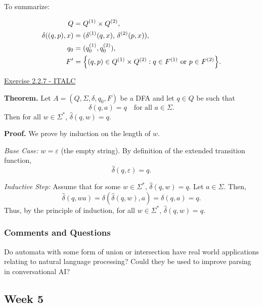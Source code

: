 \documentclass{article}
\theoremstyle{theorem}
\theoremstyle{definition}
\theoremstyle{remark}
\begin{document}
To summarize:

\[
\begin{aligned}
Q &= Q^{(1)}\times Q^{(2)}, \\
\delta((q,p),x) &= (\delta^{(1)}(q,x),\,\delta^{(2)}(p,x)), \\
q_0 &= (q_0^{(1)},q_0^{(2)}), \\
F' &= \Bigl\{(q,p) \in Q^{(1)}\times Q^{(2)} : q\in F^{(1)} \text{ or } p\in F^{(2)}\Bigr\}.
\end{aligned}
\]

\underline{Exercise 2.2.7 - ITALC}

\textbf{Theorem.} Let \(A = (Q,\Sigma,\delta,q_0,F)\) be a DFA and let \(q \in Q\) be such that 
\[
\delta(q,a) = q \quad \text{for all } a \in \Sigma.
\]
Then for all \(w \in \Sigma^*\), \(\hat{\delta}(q,w) = q\).

\textbf{Proof.} We prove by induction on the length of \(w\).

\textit{Base Case:} \(w = \varepsilon\) (the empty string).  
By definition of the extended transition function,
\[
\hat{\delta}(q,\varepsilon) = q.
\]

\textit{Inductive Step:} Assume that for some \(w \in \Sigma^*\), \(\hat{\delta}(q,w) = q\).  
Let \(a \in \Sigma\). Then,
\[
\hat{\delta}(q, wa) = \delta(\hat{\delta}(q, w), a) = \delta(q, a) = q.
\]
Thus, by the principle of induction, for all \(w \in \Sigma^*\), \(\hat{\delta}(q,w) = q\).


\subsubsection*{Comments and Questions}

Do automata with some form of union or intersection have real world applications relating to natural language processing? Could they be used to improve parsing in conversational AI? 

\subsection{Week 5}
\end{document}
